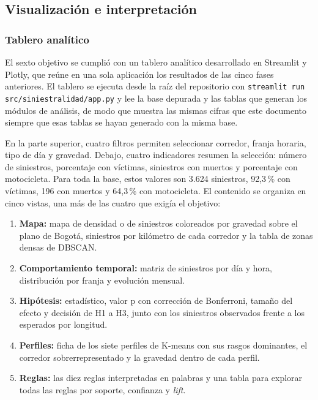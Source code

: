 \documentclass[12pt,letterpaper]{article}
\begin{document}
\subsection{Visualización e interpretación}

\subsubsection{Tablero analítico}

El sexto objetivo se cumplió con un tablero analítico desarrollado en
Streamlit y Plotly, que reúne en una sola aplicación los resultados de
las cinco fases anteriores. El tablero se ejecuta desde la raíz del
repositorio con \texttt{streamlit run src/siniestralidad/app.py} y lee
la base depurada y las tablas que generan los módulos de análisis, de
modo que muestra las mismas cifras que este documento siempre que
esas tablas se hayan generado con la misma base.

En la parte superior, cuatro filtros permiten seleccionar corredor,
franja horaria, tipo de día y gravedad. Debajo, cuatro indicadores
resumen la selección: número de siniestros, porcentaje con víctimas,
siniestros con muertos y porcentaje con motocicleta. Para toda la base,
estos valores son 3.624 siniestros, 92,3\,\% con víctimas, 196 con
muertos y 64,3\,\% con motocicleta. El contenido se organiza en cinco
vistas, una más de las cuatro que exigía el objetivo:

\begin{enumerate}[leftmargin=*,itemsep=2pt]
\item \textbf{Mapa:} mapa de densidad o de siniestros coloreados por
gravedad sobre el plano de Bogotá, siniestros por kilómetro de cada
corredor y la tabla de zonas densas de DBSCAN.
\item \textbf{Comportamiento temporal:} matriz de siniestros por día y
hora, distribución por franja y evolución mensual.
\item \textbf{Hipótesis:} estadístico, valor p con corrección de
Bonferroni, tamaño del efecto y decisión de H1 a H3, junto con los
siniestros observados frente a los esperados por longitud.
\item \textbf{Perfiles:} ficha de los siete perfiles de K-means con sus
rasgos dominantes, el corredor sobrerrepresentado y la gravedad dentro
de cada perfil.
\item \textbf{Reglas:} las diez reglas interpretadas en palabras y una
tabla para explorar todas las reglas por soporte, confianza y
\emph{lift}.
\end{enumerate}
\end{document}

